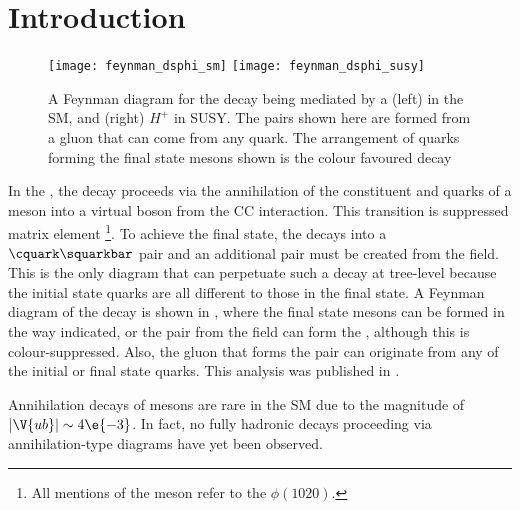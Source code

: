 \section{Introduction}

\begin{figure}[bh]
  \begin{center}
    \texttt{[image: feynman\_dsphi\_sm]}
    \texttt{[image: feynman\_dsphi\_susy]}
    \caption[Feynman diagram for the decay \btodsphi]
    {
      A Feynman diagram for the decay \btodsphi being mediated by a
      (left) \Wp in the SM, and
      (right) $H^+$ in SUSY.
      The \ssbar pairs shown here are formed from a gluon that can come from any quark.
      The arrangement of quarks forming the final state mesons shown is the colour favoured decay
    }
    \label{fig:dsphi:feyn}
  \end{center}
\end{figure}

In the \sm, the decay \btodsphi proceeds via the annihilation of the constituent \bquark and \uquark
quarks of a \Bp meson into a virtual \Wp boson from the \gls{CC} interaction.
This transition is suppressed \ckm
matrix element \footnote{
  All mentions of the \phii meson refer to the $\phi(1020)$.
}.
To achieve the final state, the \Wp decays into a $\cquark\squarkbar$ pair and an additional
\ssbar pair must be created from the \QCD field.
This is the only diagram that can perpetuate such a decay at tree-level because the initial state
quarks are all different to those in the final state.
A Feynman diagram of the decay \btodsphi is shown in , where
the final state mesons can be formed in the way indicated, or the \ssbar pair from the \QCD field
can form the \phii, although this is colour-suppressed.
Also, the gluon that forms the \ssbar pair can originate from any of the initial or final state
quarks.
This analysis was published in .

Annihilation decays of \Bp mesons are rare in the SM due to the magnitude of
$|\V{ub}|\sim4\e{-3}$.
In fact, no fully hadronic decays proceeding via annihilation-type diagrams have yet been
observed.





